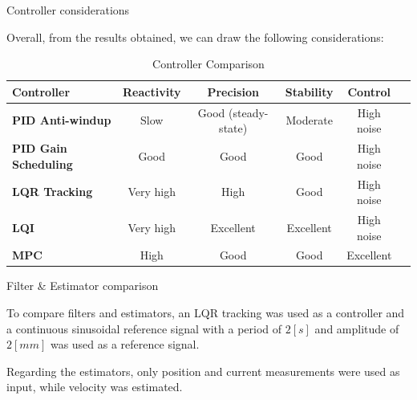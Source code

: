 \begin{frame}{Controller considerations}

    Overall, from the results obtained, we can draw the following considerations:

    \begin{table}[H]
        \centering
        \renewcommand{\arraystretch}{1}
        \begin{tabular}{|l|c|c|c|c|l|}
            \hline
            \textbf{Controller}          & \textbf{Reactivity} & \textbf{Precision}  & \textbf{Stability} & \textbf{Control} \\ \hline
            \textbf{PID Anti-windup}     & Slow                & Good (steady-state) & Moderate           & High noise       \\ \hline
            \textbf{PID Gain Scheduling} & Good                & Good                & Good               & High noise       \\ \hline
            \textbf{LQR Tracking}        & Very high           & High                & Good               & High noise       \\ \hline
            \textbf{LQI}                 & Very high           & Excellent           & Excellent          & High noise       \\ \hline
            \textbf{MPC}                 & High                & Good                & Good               & Excellent        \\ \hline
        \end{tabular}
        \caption{Controller Comparison}
    \end{table}


\end{frame}


\begin{frame}{Filter \& Estimator comparison}

    To compare filters and estimators, an LQR tracking was used as a controller and a continuous sinusoidal reference signal with a period of $2[s]$ and amplitude of $2[mm]$ was used as a reference signal.

    \vspace{9pt}

    Regarding the estimators, only position and current measurements were used as input, while velocity was estimated.

\end{frame}


